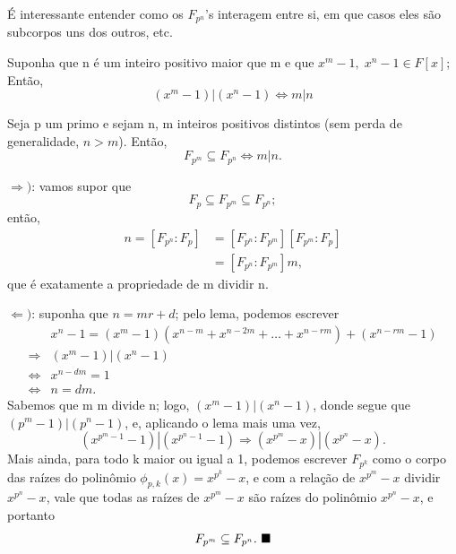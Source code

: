 \documentclass[../algebraIII_notes.tex]{subfiles}
\begin{document}
É interessante entender como os \(F_{p^{n}}\)'s interagem entre si, em que casos eles são subcorpos uns dos outros, etc.
\begin{lemma*}
	Suponha que n é um inteiro positivo maior que m e que \(x^{m}-1, \; x^{n}-1\in F[x]\); Então,
	\[
		(x^{m}-1) | (x^{n}-1) \Longleftrightarrow m |n
	\]
\end{lemma*}
\begin{theorem*}
	Seja p um primo e sejam n, m inteiros positivos distintos (sem perda de generalidade, \(n > m\)). Então,
	\[
		F_{p^{m}}\subseteq F_{p^{n}} \Longleftrightarrow m | n.
	\]
\end{theorem*}
\begin{proof*}
	\(\Rightarrow )\): vamos supor que
	\[
		F_{p}\subseteq F_{p^{m}} \subseteq F_{p^{n}};
	\]
	então,
	\begin{align*}
		n = [F_{p^{n}}:F_{p}] & = [F_{p^{n}}:F_{p^{m}}][F_{p^{m}}:F_{p}] \\
		                      & = [F_{p^{n}}:F_{p^{m}}] m,
	\end{align*}
	que é exatamente a propriedade de m dividir n.

	\(\Leftarrow )\): suponha que \(n = mr + d\); pelo lema, podemos escrever
	\begin{align*}
		                    & x^{n}-1 = (x^{m}-1)(x^{n-m}+x^{n-2m}+\dotsc +x^{n-rm}) + (x^{n-rm}-1) \\
		\Rightarrow         & (x^{m}-1) | (x^{n}-1)                                                 \\
		\Longleftrightarrow & x^{n-dm} = 1                                                          \\
		\Longleftrightarrow & n = dm.
	\end{align*}
	Sabemos que m m divide n; logo, \((x^{m}-1) | (x^{n}-1)\), donde segue que \((p^{m}-1)|(p^{n}-1)\), e, aplicando o lema mais uma vez,
	\[
		(x^{p^{m}-1}-1)|(x^{p^{n}-1} - 1) \Rightarrow (x^{p^{m}}-x) | (x^{p^{n}}-x).
	\]
	Mais ainda, para todo k maior ou igual a 1, podemos escrever \(F_{p^{k}}\) como o corpo das raízes do polinômio \(\phi_{p, k}(x) = x^{p^{k}}-x\), e com a relação de \(x^{p^{m}}-x\) dividir \(x^{p^{n}}-x\), vale que todas as raízes de \(x^{p^{m}}-x\) são raízes do polinômio \(x^{p^{n}}-x\), e portanto
	\[
		F_{p^{m}}\subseteq F_{p^{n}}. \text{ $\blacksquare$}
	\]
\end{proof*}
\end{document}
